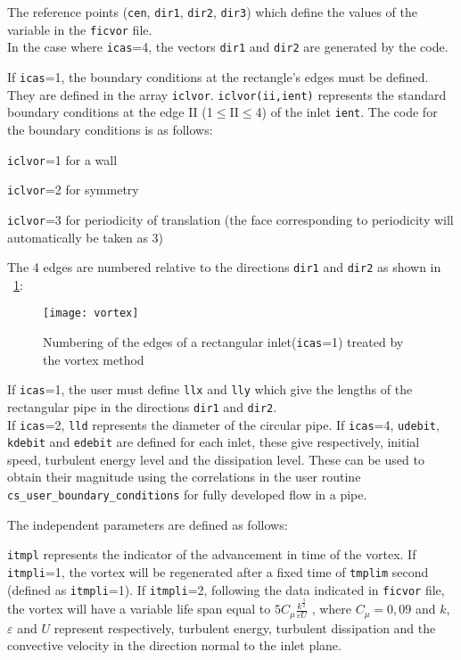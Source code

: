 {{{\begin{list}{-}{}
The reference points (\texttt{cen}, \texttt{dir1}, \texttt{dir2}, \texttt{dir3})
which define the values of the variable in the \texttt{ficvor} file.\\
In the case where \texttt{icas}=4, the vectors \texttt{dir1} and \texttt{dir2}
are generated by the code.

If \texttt{icas}=1, the boundary conditions at the rectangle's edges must be
defined. They are defined in the array
\texttt{iclvor}. \texttt{iclvor(ii,ient)} represents the standard boundary
conditions at the edge II (1$\leqslant$II$\leqslant$4) of the inlet
\texttt{ient}. The code for the boundary conditions is as follows:
\begin{list}{*}{}
\item \texttt{iclvor}=1 for a wall
\item \texttt{iclvor}=2 for symmetry
\item \texttt{iclvor}=3 for periodicity of translation (the face corresponding
      to periodicity will automatically be taken as 3)
\end{list}
The 4 edges are numbered relative to the directions \texttt{dir1} and
\texttt{dir2} as shown in \figurename~\ref{fig:vortex}:

\begin{figure}[!ht]
\centerline{
\texttt{[image: vortex]}}
\caption{Numbering of the edges of a rectangular inlet(\texttt{icas}=1)
 treated by the vortex method}\label{fig:vortex}
\end{figure}

If \texttt{icas}=1, the user must define \texttt{llx} and \texttt{lly} which give
the lengths of the rectangular pipe in the directions \texttt{dir1} and \texttt{dir2}.\\
If \texttt{icas}=2, \texttt{lld} represents the diameter of the circular pipe.
If \texttt{icas}=4, \texttt{udebit}, \texttt{kdebit} and \texttt{edebit} are
defined for each inlet, these give respectively,
initial speed, turbulent energy level and the dissipation level. These can be used to
 obtain their magnitude using the correlations in the user routine \texttt{cs\_user\_boundary\_conditions} for
 fully developed flow in a pipe.

 The independent parameters are defined as follows:
\begin{list}{*}{}
\item \texttt{itmpl} represents the indicator of the advancement in time of the
  vortex. If \texttt{itmpli}=1, the vortex will be regenerated after a fixed
  time of
  \texttt{tmplim} second (defined as \texttt{itmpli}=1).
  If \texttt{itmpli}=2, following the data indicated in \texttt{ficvor} file,
  the vortex will have a variable life span equal to
  $5 \displaystyle C_\mu \displaystyle \frac{k^{\frac{3}{2}}}{\varepsilon U}$ ,
  where $C_\mu=0,09$ and $k$, $\varepsilon$ and $U$  represent respectively, turbulent energy,
  turbulent dissipation and the convective velocity in the direction normal to the inlet plane.


\end{list}
\end{list}}}}
